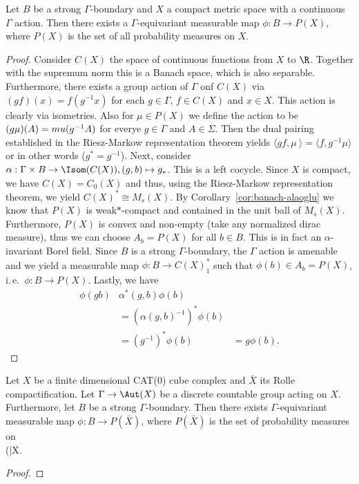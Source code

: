 \begin{thm}
  Let \(B\) be a strong \(\Gamma\)-boundary and \(X\) a compact metric space with a continuous \(\Gamma\) action. Then there exists a \(\Gamma\)-equivariant measurable map \(\phi \colon B \to P(X)\), where \(P(X)\) is the set of all probability measures on \(X\).
\end{thm}

\begin{proof}
  Consider \(C(X)\) the space of continuous functions from \(X\) to \(\R\). Together with the supremum norm this is a Banach space, which is also separable. Furthermore, there exists a group action of \(\Gamma\) onf \(C(X)\) via \((gf)(x) = f(g^{-1}x)\) for each \(g \in \Gamma\), \(f \in C(X)\) and \(x \in X\). This action is clearly via isometries. Also for \(\mu \in P(X)\) we define the action to be \((g\mu)(A) = \\mu(g^{-1} A)\) for everye \(g \in \Gamma\) and \(A \in \Sigma\). Then the dual pairing established in the Riesz-Markow representation theorem yields \(\langle gf, \mu\ \rangle = \langle f, g^{-1} \mu \rangle\) or in other words (\(g^\ast = g^{-1}\)).
  Next, consider \(\alpha: \Gamma \times B \to \Isom(C(X)), (g, b) \mapsto g_\ast\). This is a left cocycle.
  Since \(X\) is compact, we have \(C(X) = C_0(X)\) and thus, using the Riesz-Markow representation theorem, we yield \(C(X)^\ast \cong M_{s}(X)\). By Corollary~\ref{cor:banach-alaoglu} we know that \(P(X)\) is weak\(\ast\)-compact and contained in the unit ball of \(M_s(X)\). Furthermore, \(P(X)\) is convex and non-empty (take any normalized dirac measure), thus we can choose \(A_b = P(X)\) for all \(b \in B\). This is in fact an \(\alpha\)-invariant Borel field. Since \(B\) is a strong \(\Gamma\)-boundary, the \(\Gamma\) action is amenable and we yield a measurable map \(\phi \colon B \to C(X)^\ast_1\) such that \(\phi(b) \in A_b = P(X)\), i.\,e.\ \(\phi \colon B \to P(X)\). Lastly, we have
  \begin{align*}
    \phi(gb) & \alpha^\ast(g, b) \phi(b)\\
               & = \left(\alpha(g,b)^{-1}\right)^\ast \phi(b)\\
               & = \left ( g^{-1}\right)^\ast \phi(b)
               & = g\phi(b).
  \end{align*}
\end{proof}

\begin{cor}
  Let \(X\) be a finite dimensional CAT(0) cube complex and \(\bar X\) its Rolle compactification. Let \(\Gamma \to \Aut(X)\) be a discrete countable group acting on \(X\). Furthermore, let \(B\) be a strong \(\Gamma\)-boundary. Then there exists \(\Gamma\)-equivariant measurable map \(\phi\colon B \to P(\bar X)\), where \(P(\bar X)\) is the set of probability measures on \\(\bar X\).
\end{cor}

\begin{proof}
  
\end{proof}

